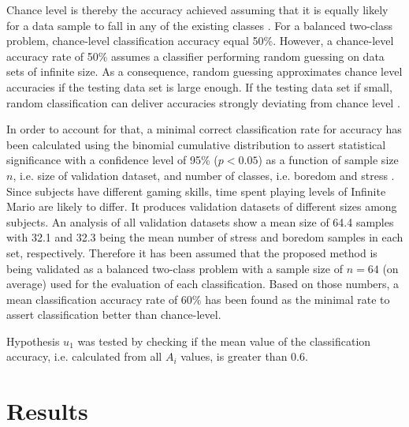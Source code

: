 Chance level is thereby the accuracy achieved assuming that it is equally likely for a data sample to fall in any of the existing classes \parencite{kassraian2016promises}. For a balanced two-class problem, chance-level classification accuracy equal 50\%. However, a chance-level accuracy rate of 50\% assumes a classifier performing random guessing on data sets of infinite size. As a consequence, random guessing approximates chance level accuracies if the testing data set is large enough. If the testing data set if small, random classification can deliver accuracies strongly deviating from chance level \parencite{combrisson2015exceeding}.

In order to account for that, a minimal correct classification rate for accuracy has been calculated using the binomial cumulative distribution to assert statistical significance with a confidence level of 95\% ($p < 0.05$) as a function of sample size $n$, i.e. size of validation dataset, and number of classes, i.e. boredom and stress \parencite{combrisson2015exceeding}. Since subjects have different gaming skills, time spent playing levels of Infinite Mario are likely to differ. It produces validation datasets of different sizes among subjects. An analysis of all validation datasets show a mean size of 64.4 samples with 32.1 and 32.3 being the mean number of stress and boredom samples in each set, respectively. Therefore it has been assumed that the proposed method is being validated as a balanced two-class problem with a sample size of $n=64$ (on average) used for the evaluation of each classification. Based on those numbers, a mean classification accuracy rate of 60\% has been found as the minimal rate to assert classification better than chance-level.

Hypothesis $u_1$ was tested by checking if the mean value of the classification accuracy, i.e. calculated from all $A_i$ values, is greater than 0.6.


\section{Results}

